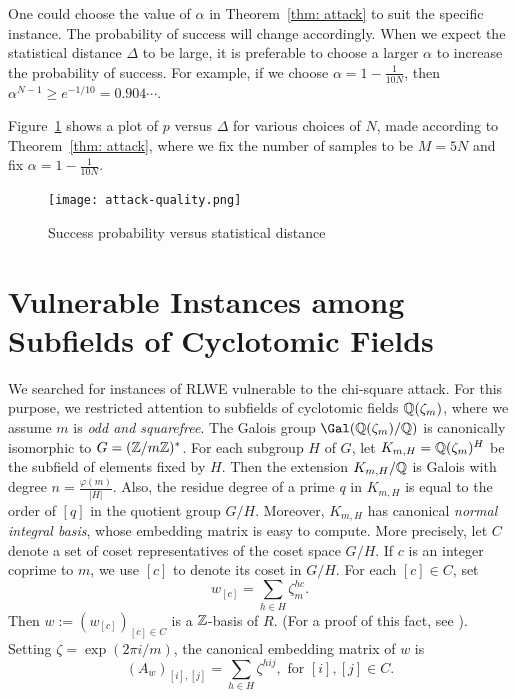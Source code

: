 \documentclass[envcountsame]{llncs}
\begin{document}
\begin{remark}
One could choose the value of $\alpha$ in Theorem~\ref{thm: attack} to suit the specific instance.
The probability of success will change accordingly. When we expect the statistical distance $\Delta$ to be large, it is preferable to choose a larger $\alpha$ to increase the probability of success.  For example, if we choose $\alpha = 1-\frac{1}{10N}$, then $\alpha^{N-1} \geq e^{-1/10} = 0.904 \cdots$.
\end{remark}

Figure~\ref{fig: probability} shows a plot of $p$ versus $\Delta$ for various choices of $N$, made according to Theorem~\ref{thm: attack}, where we fix the number of samples to be $M = 5N$ and fix $\alpha = 1-\frac{1}{10N}$.
\begin{figure}
\begin{center}
\texttt{[image: attack-quality.png]}
\caption{Success probability versus statistical distance}
\label{fig: probability}
\end{center}
\end{figure}
\section{Vulnerable Instances among Subfields of Cyclotomic Fields}\label{sec: sub-cyclotomics}
We searched for instances of RLWE vulnerable to the chi-square attack.  For this purpose, we restricted attention to subfields of cyclotomic fields $\mathbb{Q}(\zeta_m)$, where we assume $m$ is {\it odd and squarefree}. The Galois group $\Gal(\bQ(\zeta_m)/\bQ)$ is canonically isomorphic to $G = (\mathbb{Z}/m\mathbb{Z})^*$. For each subgroup $H$ of $G$, let $K_{m,H} = \mathbb{Q}(\zeta_m)^H$ be the subfield of elements fixed by $H$.
Then the extension $K_{m,H}/\mathbb{Q}$ is Galois with degree $n = \frac{\varphi(m)}{|H|}$. Also, the residue degree of a prime $q$ in $K_{m,H}$ is equal to the order of $[q]$ in the quotient group $G/H$. Moreover, $K_{m,H}$ has canonical {\it normal integral basis}, whose embedding matrix is easy to compute. More precisely, let $C$ denote a set of coset representatives of the coset space $G/H$. If $c$ is an integer coprime to $m$, we use $[c]$ to denote its coset in $G/H$. For each $[c] \in C$, set
\[
    w_{[c]} =  \sum_{h \in H} \zeta_m^{hc}.
\]
Then  $w := (w_{[c]})_{[c] \in C}$ is a $\mathbb{Z}$-basis of $R$. (For a proof of this fact, see \cite[Proposition 6.1]{johnston2011notes}). Setting $\zeta = \exp(2\pi i /m)$, the canonical  embedding matrix of $w$ is
\[
    (A_w)_{[i],[j]} = \sum_{h \in H}{\zeta^{hij}}, \mbox{ for } [i], [j] \in C.
\]
\end{document}
